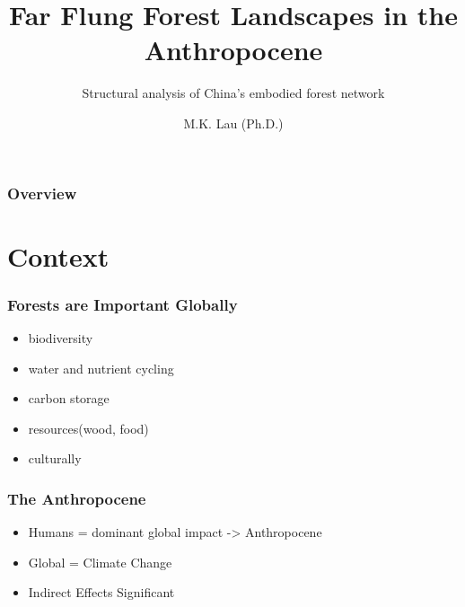 \documentclass{beamer}
\title{Far Flung Forest Landscapes in the Anthropocene}
\subtitle{Structural analysis of China's embodied forest network}
\author{M.K. Lau (Ph.D.)}
\institute{Chinese Academy of Sciences and Harvard University}
\begin{document}
\begin{frame}
  \titlepage
\end{frame}


\begin{frame}
  \frametitle{Overview}

\tableofcontents


\end{frame}


\section{Context}

\begin{frame}
  \frametitle{Forests are Important Globally}

  \begin{itemize}
  \item biodiversity
  \item water and nutrient cycling
  \item carbon storage
  \item resources(wood, food)
  \item culturally
  \end{itemize}

\end{frame}

\begin{frame}
  \frametitle{The Anthropocene}


  \begin{itemize}
  \item Humans = dominant global impact -> Anthropocene
  \item Global = Climate Change
  \item Indirect Effects Significant
  \end{itemize}


\end{frame}
\end{document}
